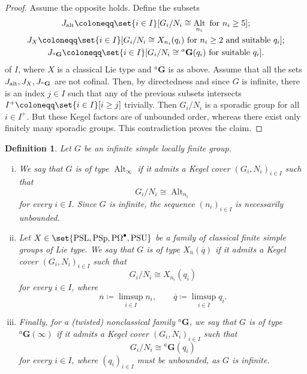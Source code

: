 \documentclass[a4paper,12pt]{amsproc}
\DeclareMathOperator{\PSU}{PSU}%
\DeclareMathOperator{\PSL}{PSL}%
\DeclareMathOperator{\PSp}{PSp}%
\DeclareMathOperator{\POmega}{P\Omega}%
\DeclareMathOperator{\Alt}{Alt}%
\theoremstyle{plain}
\newtheorem{definition}{Definition}[section]
\theoremstyle{definition}
\begin{document}
\begin{proof}
Assume the opposite holds. Define the subsets 
\begin{gather*}
J_{\rm alt}\coloneqq\set{i\in I}[G_i/N_i\cong \Alt_{n_i}\text{ for }n_i\geq 5];\\
J_X\coloneqq\set{i\in I}[G_i/N_i\cong X_{n_i}(q_i)\text{ for }n_i\geq2\text{ and suitable } q_i];\\
J_{{}^a\mathbf{G}}\coloneqq\set{i\in I}[G_i/N_i\cong{}^a\mathbf{G}(q_i)\text{ for suitable } q_i].
\end{gather*}
of $I$, where $X$ is a classical Lie type and ${}^a\mathbf{G}$ is as above. Assume that all the sets $J_{\rm alt},J_X,J_{{}^a\mathbf{G}}$ are not cofinal. Then, by directedness and since $G$ is infinite, there is an index $j\in I$ such that any of the previous subsets intersects $I^+\coloneqq\set{i\in I}[i\geq j]$ trivially. Then $G_i/N_i$ is a sporadic group for all $i\in I^+$. But these Kegel factors are of unbounded order, whereas there exist only finitely many sporadic groups. This contradiction proves the claim.
\end{proof}

\begin{definition}\label{def:type}
Let $G$ be an infinite simple locally finite group.

\begin{enumerate}[(i)]
\item We say that $G$ is of \emph{type $\Alt_\infty$} if it admits a Kegel cover $(G_i,N_i)_{i\in I}$ such that
$$
G_i/N_i \cong \Alt_{n_i}
$$
for every $i\in I$. Since $G$ is infinite, the sequence $(n_i)_{i\in I}$ is necessarily unbounded.
\item Let $X\in\set{\PSL,\PSp,\POmega^\bullet,\PSU}$ be a family of classical finite simple groups of Lie type. We say that $G$ is of \emph{type $X_{\overline{n}}(\overline{q})$} if it admits a Kegel cover $(G_i,N_i)_{i\in I}$ such that
$$
G_i/N_i \cong X_{n_i}(q_i)
$$
for every $i\in I$, where
$$
\overline{n}\coloneqq\limsup_{i\in I} n_i,
\qquad
\overline{q}\coloneqq\limsup_{i\in I} q_i.
$$
\item Finally, for a (twisted) nonclassical family ${}^a\mathbf{G}$, we say that $G$ is of \emph{type ${}^a\mathbf{G}(\infty)$} if it admits a Kegel cover $(G_i,N_i)_{i\in I}$ such that
$$
G_i/N_i \cong {}^a\mathbf{G}(q_i)
$$
for every $i\in I$, where $(q_i)_{i\in I}$ must be unbounded, as $G$ is infinite.
\end{enumerate}
\end{definition}
\end{document}
